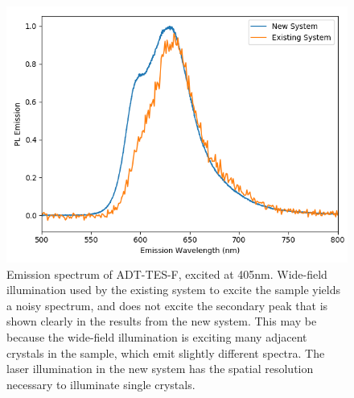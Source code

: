 \documentclass{article}
\begin{document}
    \begin{figure}[h!]
        \centering
        \includegraphics[width=\textwidth]{fig.png}
        \caption{Emission spectrum of ADT-TES-F, excited at 405nm. Wide-field illumination used by the existing system to excite the sample yields a noisy spectrum, and does not excite the secondary peak that is shown clearly in the results from the new system. This may be because the wide-field illumination is exciting many adjacent crystals in the sample, which emit slightly different spectra. The laser illumination in the new system has the spatial resolution necessary to illuminate single crystals.}
    \end{figure}
\end{document}
